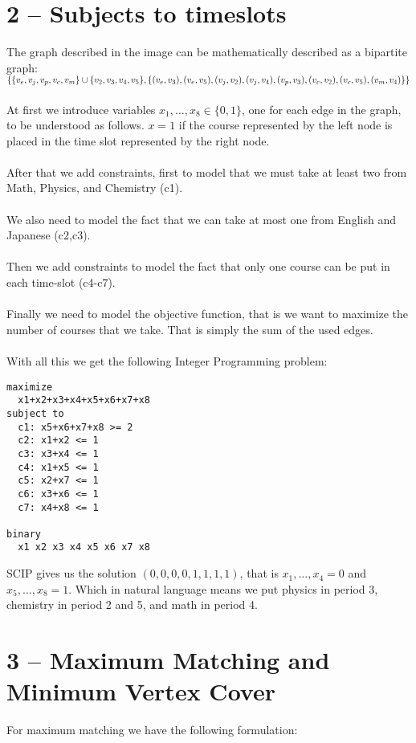 \documentclass[12pt]{report}
\begin{document}
\section*{2 -- Subjects to timeslots}
The graph described in the image can be mathematically described as a bipartite graph: \\
$ \{ \{v_e,v_j,v_p,v_c,v_m\} \cup \{v_2,v_3,v_4,v_5 \},\\
    \{(v_e,v_3),(v_e,v_5),(v_j,v_2),(v_j,v_4),(v_p,v_3),(v_c,v_2),(v_c,v_5),(v_m,v_4)\}\}$ \\
\\
At first we introduce variables $x_1,\ldots,x_8 \in \{0,1\}$, one for each edge in the graph, to be understood as follows. $x=1$ if the course represented by the left node is placed in the time slot represented by the right node. 
\\
\\
After that we add constraints, first to model that we must take at least two from Math, Physics, and Chemistry (c1).
\\
\\
We also need to model the fact that we can take at most one from English and Japanese (c2,c3).
\\
\\
Then we add constraints to model the fact that only one course can be put in each time-slot (c4-c7).
\\ 
\\
Finally we need to model the objective function, that is we want to maximize the number of courses that we take. That is simply the sum of the used edges.
\\
\\
With all this we get the following Integer Programming problem: \\
\begin{verbatim}
maximize
  x1+x2+x3+x4+x5+x6+x7+x8
subject to
  c1: x5+x6+x7+x8 >= 2
  c2: x1+x2 <= 1
  c3: x3+x4 <= 1
  c4: x1+x5 <= 1
  c5: x2+x7 <= 1
  c6: x3+x6 <= 1
  c7: x4+x8 <= 1

binary
  x1 x2 x3 x4 x5 x6 x7 x8
\end{verbatim}

SCIP gives us the solution $(0,0,0,0,1,1,1,1)$, that is $x_1,\ldots,x_4 = 0$ and $x_5,\ldots,x_8 = 1$. Which in natural language means we put physics in period 3, chemistry in period 2 and 5, and math in period 4.

\section*{3 -- Maximum Matching and Minimum Vertex Cover}
For maximum matching we have the following formulation:
\end{document}
